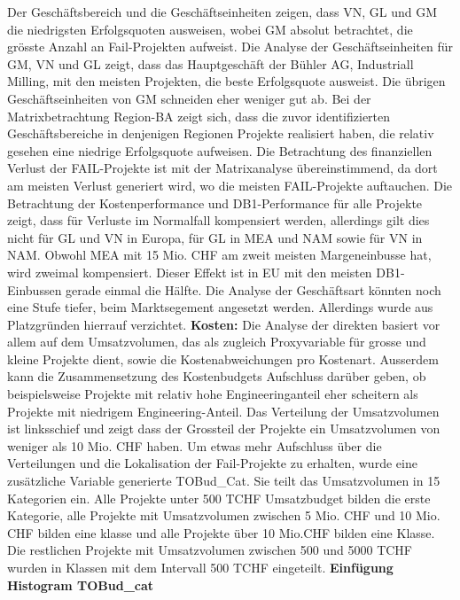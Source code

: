 Der Geschäftsbereich und die Geschäftseinheiten zeigen, dass VN, GL und GM die niedrigsten Erfolgsquoten ausweisen, wobei GM absolut betrachtet, die grösste Anzahl an Fail-Projekten aufweist. Die Analyse der Geschäftseinheiten für GM, VN und GL zeigt, dass das Hauptgeschäft der Bühler AG, Industriall Milling, mit den meisten Projekten, die beste Erfolgsquote ausweist. Die übrigen Geschäftseinheiten von GM schneiden eher weniger gut ab. Bei der Matrixbetrachtung Region-BA zeigt sich, dass die zuvor identifizierten Geschäftsbereiche in denjenigen Regionen Projekte realisiert haben, die relativ gesehen eine niedrige Erfolgsquote aufweisen. Die Betrachtung des finanziellen Verlust der FAIL-Projekte ist mit der Matrixanalyse übereinstimmend, da dort am meisten Verlust generiert wird, wo die meisten FAIL-Projekte auftauchen. Die Betrachtung der Kostenperformance und DB1-Performance für alle Projekte zeigt, dass für Verluste im Normalfall kompensiert werden, allerdings gilt dies nicht für GL und VN in Europa, für GL in MEA und NAM sowie für VN in NAM. Obwohl MEA mit 15 Mio. CHF am zweit meisten Margeneinbusse hat, wird zweimal kompensiert. Dieser Effekt ist in EU mit den meisten DB1-Einbussen gerade einmal die Hälfte. Die Analyse der Geschäftsart könnten noch eine Stufe tiefer, beim Marktsegement angesetzt werden. Allerdings wurde aus Platzgründen hierrauf verzichtet.
\newline\textbf{Kosten:} Die Analyse der direkten basiert vor allem auf dem Umsatzvolumen, das als zugleich Proxyvariable für grosse und kleine Projekte dient, sowie die Kostenabweichungen pro Kostenart. Ausserdem kann die Zusammensetzung des Kostenbudgets Aufschluss darüber geben, ob beispielsweise Projekte mit relativ hohe Engineeringanteil eher scheitern als Projekte mit niedrigem Engineering-Anteil. 
Das Verteilung der Umsatzvolumen ist linksschief und zeigt dass der Grossteil der Projekte ein Umsatzvolumen von weniger als 10 Mio. CHF haben. Um etwas mehr Aufschluss über die Verteilungen und die Lokalisation der Fail-Projekte zu erhalten, wurde eine zusätzliche Variable generierte TOBud\_Cat. Sie teilt das Umsatzvolumen in 15 Kategorien ein. Alle Projekte unter 500 TCHF Umsatzbudget bilden die erste Kategorie, alle Projekte mit Umsatzvolumen zwischen 5 Mio. CHF und 10 Mio. CHF bilden eine klasse und alle Projekte über 10 Mio.CHF bilden eine Klasse. Die restlichen Projekte mit Umsatzvolumen zwischen 500 und 5000 TCHF wurden in Klassen mit dem Intervall 500 TCHF eingeteilt. 
\newline\textbf{Einfügung Histogram TOBud\_cat}
